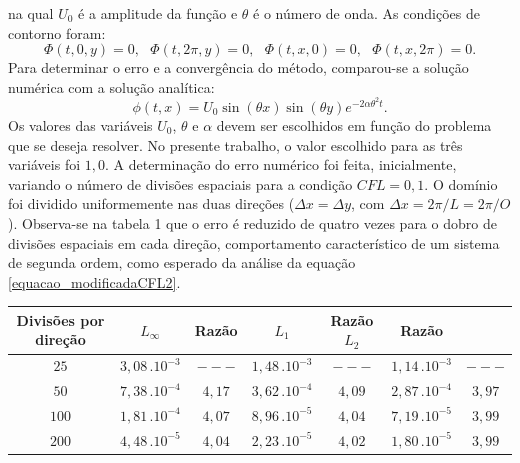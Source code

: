 \documentclass[a0,portrait]{a0poster}
\begin{document}
\begin{minipage}[c]{\linewidth}
\begin{framed}
\begin{multicols}{2}
\begin{equation}
\end{equation}
na qual $U_0$ é a amplitude da função e $\theta$ é o número de onda. As condições de contorno foram:
\begin{equation} \label{condicoes_contorno}
\Phi(t,0,y)=0, \ \ \ \Phi(t,2\pi,y)=0,  \ \ \ \Phi(t,x,0)=0, \ \ \ \Phi(t,x,2\pi)=0.
\end{equation}
Para determinar o erro e a convergência do método, comparou-se a solução numérica com a solução analítica:
\begin{equation} \label{solucao_analitica}
\phi(t,x)=U_0 \sin\left(\theta x\right) \sin\left(\theta y\right) e^{-2 \alpha \theta^2 t}.
\end{equation}
Os valores das variáveis $U_0$, $\theta$ e $\alpha$ devem ser escolhidos em função do problema que se deseja resolver. No presente trabalho, o valor escolhido para as três variáveis foi $1,0$. A determinação do erro numérico foi feita, inicialmente, variando o número de divisões espaciais para a condição $CFL = 0,1$. O domínio foi dividido uniformemente nas duas direções ($\Delta x = \Delta y$, com $\Delta x = 2\pi/L = 2\pi/O$). Observa-se na tabela 1 que o erro é reduzido de quatro vezes para o dobro de divisões espaciais em cada direção, comportamento característico de um sistema de segunda ordem, como esperado da análise da equação \ref{equacao_modificadaCFL2}.

\begin{center}
	\begin{tabular}{c|cc|cc|cc}
		\toprule
		Divisões por direção   &  $L_\infty$       	& Razão     & $L_{1}$ 				& Razão 	  $L_{2}$       	& Razão    \\  \toprule
		$25$ 				  & $3,08 \, . 10^{-3}$      & $---$    & $1,48 \, . 10^{-3}$       & $---$         & $1,14 \, . 10^{-3}$      & $---$    \\ 
		$50$ 				  & $7,38 \, . 10^{-4}$      & $4,17$   & $3,62 \, . 10^{-4}$       & $4,09$   	    & $2,87 \, . 10^{-4}$      & $3,97$   \\ 
		$100$ 				  & $1,81 \, . 10^{-4}$      & $4,07$   & $8,96 \, . 10^{-5}$       & $4,04$    	& $7,19 \, . 10^{-5}$      & $3,99$   \\ 
		$200$ 				  & $4,48 \, . 10^{-5}$      & $4,04$   & $2,23 \, . 10^{-5}$       & $4,02$        & $1,80 \, . 10^{-5}$      & $3,99$   \\
		\bottomrule
	\end{tabular}
\end{center}



\end{multicols}
\end{framed}
\end{minipage}
\end{document}
